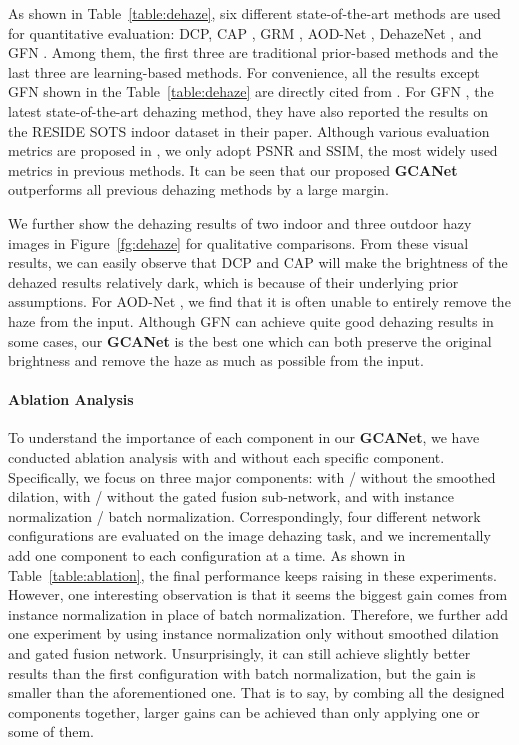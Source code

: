 \documentclass[10pt,twocolumn,letterpaper]{article}
\newcommand{\Tref}[1]{Table~\ref{#1}}
\newcommand{\Fref}[1]{Figure~\ref{#1}}
\begin{document}
As shown in \Tref{table:dehaze}, six different state-of-the-art methods are used for quantitative evaluation: DCP\cite{he2011single}, CAP \cite{zhu2015fast}, GRM \cite{chen2016robust}, AOD-Net \cite{li2017aod}, DehazeNet \cite{cai2016dehazenet}, and GFN \cite{ren2018gated}. Among them, the first three are traditional prior-based methods and the last three are learning-based methods. For convenience, all the results except GFN shown in the \Tref{table:dehaze} are directly cited from \cite{li2017reside}. For GFN \cite{ren2018gated}, the latest state-of-the-art dehazing method, they have also reported the results on the RESIDE SOTS indoor dataset in their paper. Although various evaluation metrics are proposed in \cite{li2017reside}, we only adopt PSNR and SSIM, the most widely used metrics in previous methods. It can be seen that our proposed \textbf{GCANet} outperforms all previous dehazing methods by a large margin. 

We further show the dehazing results of two indoor and three outdoor hazy images in \Fref{fg:dehaze} for qualitative comparisons. From these visual results, we can easily observe that DCP \cite{he2011single} and CAP \cite{zhu2015fast} will make the  brightness of the dehazed results relatively dark, which is because of their underlying prior assumptions. For AOD-Net \cite{li2017aod}, we find that it is often unable to entirely remove the haze from the input. Although GFN \cite{ren2018gated} can achieve quite good dehazing results in some cases, our \textbf{GCANet} is the best one which can both preserve the original brightness and remove the haze as much as possible from the input.



\paragraph{Ablation Analysis} To understand the importance of each component in our \textbf{GCANet}, we have conducted ablation analysis with and without each specific component. Specifically, we focus on three major components: with / without the smoothed dilation, with / without the gated fusion sub-network, and with instance normalization / batch normalization. Correspondingly, four different network configurations are evaluated on the image dehazing task, and we incrementally add one component to each configuration at a time. As shown in \Tref{table:ablation}, the final performance keeps raising in these  experiments. However, one interesting observation is that it seems the biggest gain comes from instance normalization in place of batch normalization. Therefore, we further add one experiment by using instance normalization only without smoothed dilation and gated fusion network. Unsurprisingly, it can still achieve slightly better results than the first configuration with batch normalization, but the gain is smaller than the aforementioned one. That is to say, by combing all the designed components together, larger gains can be achieved than only applying one or some of them.
\end{document}

